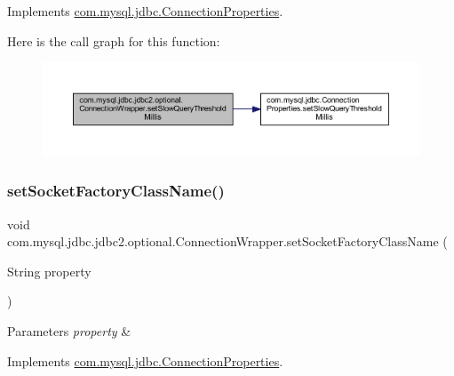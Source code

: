 Implements \mbox{\hyperlink{interfacecom_1_1mysql_1_1jdbc_1_1_connection_properties_a3cfee5c659ab60c5fdb925490d81ad0f}{com.\+mysql.\+jdbc.\+Connection\+Properties}}.

Here is the call graph for this function\+:
\nopagebreak
\begin{figure}[H]
\begin{center}
\leavevmode
\includegraphics[width=350pt]{classcom_1_1mysql_1_1jdbc_1_1jdbc2_1_1optional_1_1_connection_wrapper_ac0a113a1ba7f79345af3609e978a93fe_cgraph}
\end{center}
\end{figure}
\mbox{\label{classcom_1_1mysql_1_1jdbc_1_1jdbc2_1_1optional_1_1_connection_wrapper_a7a51e27bd16ff0326a017cb9efe65e53}} 
\subsubsection{\texorpdfstring{set\+Socket\+Factory\+Class\+Name()}{setSocketFactoryClassName()}}
{\footnotesize\ttfamily void com.\+mysql.\+jdbc.\+jdbc2.\+optional.\+Connection\+Wrapper.\+set\+Socket\+Factory\+Class\+Name (\begin{DoxyParamCaption}\item[{String}]{property }\end{DoxyParamCaption})}


\begin{DoxyParams}{Parameters}
{\em property} & \\
\hline
\end{DoxyParams}


Implements \mbox{\hyperlink{interfacecom_1_1mysql_1_1jdbc_1_1_connection_properties_ab0f719c12e2d1fe7fe6dd180e8c7a825}{com.\+mysql.\+jdbc.\+Connection\+Properties}}.

